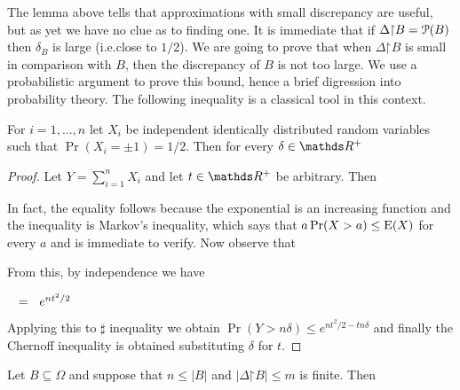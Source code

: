 \documentclass[creche.tex]{subfiles}
\begin{document}
The lemma above tells that approximations with small discrepancy are useful, but as yet we have no clue as to finding one. It is immediate that if $\Delta\mathord\restriction B=\P(B)$ then $\delta_B$ is large (i.e.\@ close to $1/2$). We are going to prove that when $\Delta\mathord\restriction B$ is small in comparison with $B$, then the discrepancy of $B$ is not too large. We use a probabilistic argument to prove this bound, hence a brief digression into probability theory. The following inequality is a classical tool in this context.

\begin{lemma}\label{Chernoff}
For $i=1,\dots,n$ let $X_i$ be independent identically distributed random variables such that $\Pr(X_i=\pm1)=1/2$. Then for every $\delta\in\RR^+$

\end{lemma}
\begin{proof}
Let $\displaystyle Y=\sum^n_{i=1}X_i$ and let $t\in\RR^+$ be arbitrary. Then



In fact, the equality follows because the exponential is an increasing function and the inequality is Markov's inequality, which says that $a\Pr(X>a)\le{\rm E}(X)$ for every $a$ and is immediate to verify. Now observe that






From this, by independence we have 

$\medrel{=}e^{nt^2/2}$


Applying this to $\sharp$ inequality we obtain $\Pr(Y>n\delta)\le e^{nt^2/2-tn\delta}$ and finally the Chernoff inequality is obtained substituting $\delta$ for $t$. 
\end{proof}

\begin{lemma}\label{lem_discrepanzarandom} Let $B\subseteq\Omega$ and suppose that $n\le|B|$ and $|\Delta \mathord\restriction B|\le m$ is finite. Then

\end{lemma}
\end{document}

